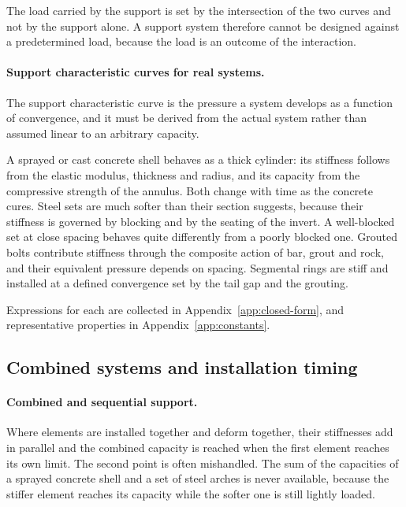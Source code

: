 The load carried by the support is set by the intersection of the two
curves and not by the support alone. A support system therefore cannot be
designed against a predetermined load, because the load is an outcome of the
interaction.

\paragraph{Support characteristic curves for real systems.}
The support characteristic curve is the pressure a system develops as a
function of convergence, and it must be derived from the actual system rather
than assumed linear to an arbitrary capacity.

A sprayed or cast concrete shell behaves as a thick cylinder: its stiffness
follows from the elastic modulus, thickness and radius, and its capacity from
the compressive strength of the annulus. Both change with time as the concrete
cures. Steel sets are much softer than their section suggests, because their
stiffness is governed by blocking and by the seating of the invert.
A well-blocked set at close spacing behaves quite differently from
a poorly blocked one. Grouted bolts contribute stiffness through the composite
action of bar, grout and rock, and their equivalent pressure depends on
spacing. Segmental rings are stiff and installed at a defined convergence set
by the tail gap and the grouting.

Expressions for each are collected in Appendix~\ref{app:closed-form}, and
representative properties in Appendix~\ref{app:constants}.

\subsection{Combined systems and installation timing}
\label{sec:combined-systems-and-installation-timing}

\paragraph{Combined and sequential support.}
Where elements are installed together and deform together, their stiffnesses
add in parallel and the combined capacity is reached when the first element
reaches its own limit. The second point is often mishandled. The sum of the
capacities of a sprayed concrete shell and a set of steel arches
is never available, because the stiffer element reaches its capacity while the
softer one is still lightly loaded.

